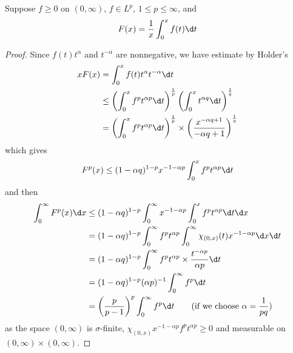 \documentclass[12pt, a4paper, oneside]{book}
\begin{document}
\begin{theorem}
    Suppose $f\geq 0$ on $(0, \infty)$, $f\in L^p$, $1\leq p \leq \infty$, and
    \begin{equation*}F(x) = \frac{1}{x} \int_0^x f(t) \d t\end{equation*}
    \begin{proof}
        Since $f(t) t^\alpha$ and $t^{-\alpha}$ are nonnegative, we have estimate by Holder's
        $$
            \begin{aligned}
                x F(x) & =\int_0^x f(t) t^\alpha t^{-\alpha} \d  t                                                                                       \\
                       & \leq\left(\int_0^x f^p t^{\alpha p} \d t\right)^{\frac{1}{p}}\left(\int_0^x t^{\alpha q} \d t\right)^{\frac{1}{q}}              \\
                       & =\left(\int_0^x f^p t^{\alpha p} \d t\right)^{\frac{1}{p}} \times\left(\frac{x^{-\alpha q+1}}{-\alpha q+1}\right)^{\frac{1}{q}}
            \end{aligned}
        $$
        which gives
        $$
            F^p(x) \leq(1-\alpha q)^{1-p} x^{-1-\alpha p} \int_0^x f^p t^{\alpha p} \d t
        $$
        and then
        $$
            \begin{aligned}
                \int_0^{\infty} F^p(x) \d  x & \leq(1-\alpha q)^{1-p} \int_0^{\infty} x^{-1-\alpha p} \int_0^x f^p t^{\alpha p} \d  t \d x                        \\
                                             & = (1-\alpha q)^{1-p} \int_0^{\infty} f^p t^{\alpha p} \int_0^{\infty} \chi_{(0, x)}(t) x^{-1-\alpha p} \d  x \d  t \\
                                             & =(1-\alpha q)^{1-p} \int_0^{\infty} f^p t^{\alpha p} \times \frac{t^{-\alpha p}}{\alpha p} \d  t                   \\
                                             & =(1-\alpha q)^{1-p}(\alpha p)^{-1} \int_0^{\infty} f^p \d  t                                                       \\
                                             & = \left(\frac{p}{p-1}\right)^p \int_0^{\infty} f^p \d  t \quad \quad (\text{if we choose } \alpha=\frac{1}{pq})
            \end{aligned}
        $$
        as the space $(0, \infty)$ is $\sigma$-finite, $\chi_{(0, x)} x^{-1-\alpha p} f^p t^{\alpha p} \geq 0$ and measurable on $(0, \infty) \times(0, \infty)$.
    \end{proof}
\end{theorem}
\end{document}
